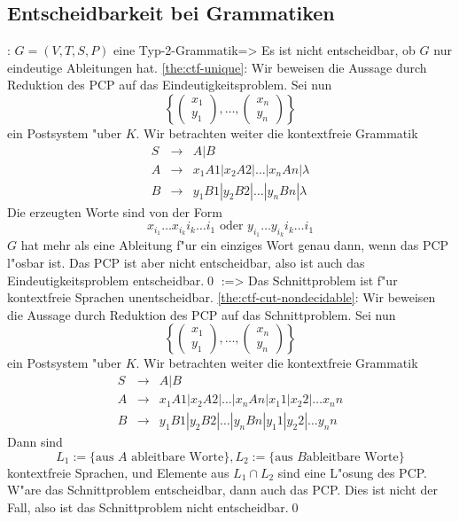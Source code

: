 \subsection{Entscheidbarkeit bei Grammatiken}
\theorem:
  $G=(V,T,S,P)$ eine Typ-2-Grammatik=>{
  \label{the:ctf-unique}
  Es ist nicht entscheidbar, ob $G$ nur eindeutige Ableitungen hat.
  }
\proof \ref{the:ctf-unique}:{
  Wir beweisen die Aussage durch Reduktion des PCP auf das Eindeutigkeitsproblem.
  Sei nun
  \[\left\{\begin{pmatrix}x_1\\y_1\end{pmatrix}, \dots,
    \begin{pmatrix}x_n\\y_n\end{pmatrix}\right\}\]
  ein Postsystem "uber $K$. Wir betrachten weiter die kontextfreie
  Grammatik
  \begin{eqnarray*}
    S &\to& A | B\\
    A &\to& x_1 A 1 | x_2 A 2 | \dots | x_n A n | \lambda\\
    B &\to& y_1 B 1 | y_2 B 2 | \dots | y_n B n | \lambda
    \end{eqnarray*}
  Die erzeugten Worte sind von der Form
  \[x_{i_1} \dots x_{i_k} i_k \dots i_1 \text{ oder } y_{i_1} \dots
  y_{i_k} i_k \dots i_1\]
  $G$ hat mehr als eine Ableitung f"ur ein einziges Wort genau dann, wenn
  das PCP l"osbar ist. Das PCP ist aber nicht entscheidbar, also ist auch
  das Eindeutigkeitsproblem entscheidbar.\qed
  }
\theorem:=>{
  \label{the:ctf-cut-nondecidable}
  Das Schnittproblem ist f"ur kontextfreie Sprachen unentscheidbar.
  }
\proof \ref{the:ctf-cut-nondecidable}:{
  Wir beweisen die Aussage durch Reduktion des PCP auf das Schnittproblem.
  Sei nun
  \[\left\{\begin{pmatrix}x_1\\y_1\end{pmatrix}, \dots,
    \begin{pmatrix}x_n\\y_n\end{pmatrix}\right\}\]
  ein Postsystem "uber $K$.
  Wir betrachten weiter die kontextfreie Grammatik
  \begin{eqnarray*}
    S &\to& A|B\\
    A &\to& x_1 A 1 | x_2 A 2 | \dots | x_n A n | x_1 1 | x_2 2 | \dots
    x_n n\\
    B &\to& y_1 B 1 | y_2 B 2 | \dots | y_n B n | y_1 1 | y_2 2 | \dots
    y_n n
  \end{eqnarray*}
  Dann sind 
  \[L_1 := \{\text{aus $A$ ableitbare Worte}\}, L_2 := \{\text{aus $B$
    ableitbare Worte}\}
    \]
  kontextfreie Sprachen, und Elemente aus $L_1 \cap L_2$ sind eine L"osung des
  PCP. W"are das Schnittproblem entscheidbar, dann auch das
  PCP. Dies ist nicht der Fall, also ist das Schnittproblem nicht
  entscheidbar.\qed
  }
